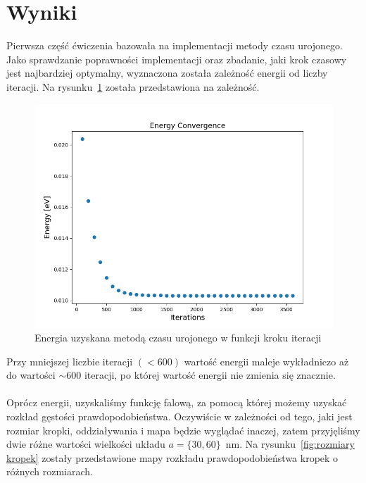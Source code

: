 \documentclass{article}
\begin{document}
\section{Wyniki}
Pierwsza część ćwiczenia bazowała na implementacji metody czasu urojonego.
Jako sprawdzanie poprawności implementacji oraz zbadanie, jaki krok czasowy jest najbardziej optymalny, wyznaczona została zależność energii od liczby iteracji.
Na rysunku~\ref{fig:ex1} została przedstawiona na zależność.
\begin{figure}[htp!]
    \centering
    \includegraphics[width=0.75\linewidth]{ex1_energy_convergence.png}
    \caption{Energia uzyskana metodą czasu urojonego w funkcji kroku iteracji}
    \label{fig:ex1}
\end{figure}
Przy mniejszej liczbie iteracji $(<600)$ wartość energii maleje wykładniczo aż do wartości $\sim 600$ iteracji, po której wartość energii nie zmienia się znacznie.\\
\\
Oprócz energii, uzyskaliśmy funkcję falową, za pomocą której możemy uzyskać rozkład gęstości prawdopodobieństwa.
Oczywiście w zależności od tego, jaki jest rozmiar kropki, oddziaływania i mapa będzie wyglądać inaczej, zatem przyjęliśmy dwie różne wartości wielkości układu $a = \{30, 60\}$~nm.
Na rysunku~\ref{fig:rozmiary kropek} zostały przedstawione mapy rozkładu prawdopodobieństwa kropek o różnych rozmiarach.
\end{document}
